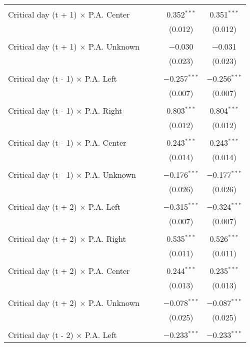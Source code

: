 \documentclass[
]{article}
\begin{document}
\begin{table}[!htbp]
{\begin{tabular}{@{\extracolsep{5pt}}lcccc}
  & & & & \\ 
 Critical day (t + 1) $\times$ P.A. Center &  &  & 0.352$^{***}$ & 0.351$^{***}$ \\ 
  &  &  & (0.012) & (0.012) \\ 
  & & & & \\ 
 Critical day (t + 1) $\times$ P.A. Unknown &  &  & $-$0.030 & $-$0.031 \\ 
  &  &  & (0.023) & (0.023) \\ 
  & & & & \\ 
 Critical day (t - 1) $\times$ P.A. Left &  &  & $-$0.257$^{***}$ & $-$0.256$^{***}$ \\ 
  &  &  & (0.007) & (0.007) \\ 
  & & & & \\ 
 Critical day (t - 1) $\times$ P.A. Right &  &  & 0.803$^{***}$ & 0.804$^{***}$ \\ 
  &  &  & (0.012) & (0.012) \\ 
  & & & & \\ 
 Critical day (t - 1) $\times$ P.A. Center &  &  & 0.243$^{***}$ & 0.243$^{***}$ \\ 
  &  &  & (0.014) & (0.014) \\ 
  & & & & \\ 
 Critical day (t - 1) $\times$ P.A. Unknown &  &  & $-$0.176$^{***}$ & $-$0.177$^{***}$ \\ 
  &  &  & (0.026) & (0.026) \\ 
  & & & & \\ 
 Critical day (t + 2) $\times$ P.A. Left &  &  & $-$0.315$^{***}$ & $-$0.324$^{***}$ \\ 
  &  &  & (0.007) & (0.007) \\ 
  & & & & \\ 
 Critical day (t + 2) $\times$ P.A. Right &  &  & 0.535$^{***}$ & 0.526$^{***}$ \\ 
  &  &  & (0.011) & (0.011) \\ 
  & & & & \\ 
 Critical day (t + 2) $\times$ P.A. Center &  &  & 0.244$^{***}$ & 0.235$^{***}$ \\ 
  &  &  & (0.013) & (0.013) \\ 
  & & & & \\ 
 Critical day (t + 2) $\times$ P.A. Unknown &  &  & $-$0.078$^{***}$ & $-$0.087$^{***}$ \\ 
  &  &  & (0.025) & (0.025) \\ 
  & & & & \\ 
 Critical day (t - 2) $\times$ P.A. Left &  &  & $-$0.233$^{***}$ & $-$0.233$^{***}$ \\ 

\end{tabular}}
\end{table}
\end{document}
